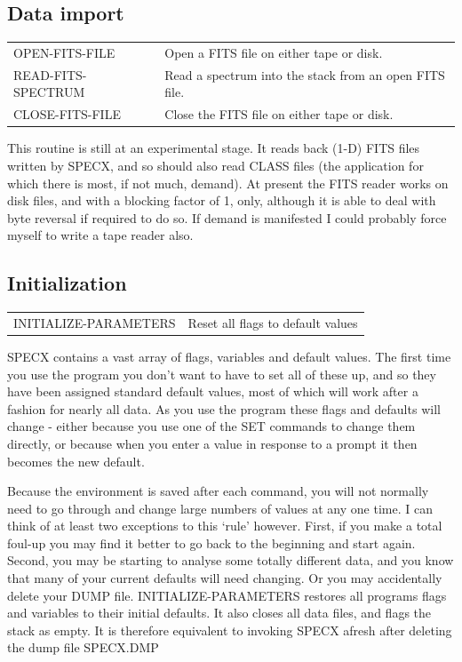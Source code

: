 \documentclass[11pt,twoside]{report}
\begin{document}
\subsection{Data import}

\begin{tabular}{ll}
OPEN-FITS-FILE      & Open a FITS file on either tape or disk.\\
READ-FITS-SPECTRUM  & Read a spectrum into the stack from an open FITS file.\\
CLOSE-FITS-FILE     & Close the FITS file on either tape or disk.\\
\end{tabular}

This routine is still at an experimental stage. It reads back (1-D) FITS files
written by SPECX, and so should also read CLASS files (the application for
which there is most, if not much, demand). At present the FITS reader works on
disk files, and with a blocking factor of 1, only, although it is able to deal
with byte reversal if required to do so. If demand is manifested I could
probably force myself to write a tape reader also.

\subsection{Initialization}

\begin{tabular}{ll}
INITIALIZE-PARAMETERS & Reset all flags to default values\\
\end{tabular}

SPECX contains a vast array of flags, variables and default values. The first
time you use the program you don't want to have to set all of these up, and
so they have been assigned standard default values, most of which will work
after a fashion for nearly all data. As you use the program these flags and
defaults will change - either because you use one of the SET commands to
change them directly, or because when you enter a value in response to a
prompt it then becomes the new default.

Because the environment is
saved after each command, you will not normally need to go through and change
large numbers of values at any one time. I can think of at least two exceptions
to this `rule' however. First, if you make a total foul-up you may find it
better to go back to the beginning and start again. Second, you may be starting
to analyse some totally different data, and you know that many of your current
defaults will need changing. Or you may accidentally delete your DUMP file.
INITIALIZE-PARAMETERS restores all programs flags and variables to their initial
defaults. It also closes all data files, and flags the stack as empty.
It is therefore equivalent to invoking SPECX afresh after deleting the dump file
SPECX.DMP
\end{document}
